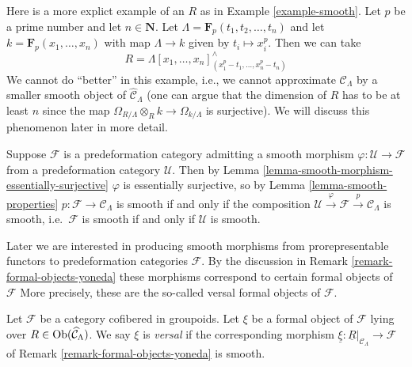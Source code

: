 \begin{example}
\label{example-smooth-explicit}
Here is a more explict example of an $R$ as in
Example \ref{example-smooth}.
Let $p$ be a prime number and let $n \in \mathbf{N}$.
Let $\Lambda = \mathbf{F}_p(t_1, t_2, \ldots, t_n)$ and let
$k = \mathbf{F}_p(x_1, \ldots, x_n)$ with map $\Lambda \to k$ given
by $t_i \mapsto x_i^p$. Then we can take
$$
R = \Lambda[x_1, \ldots, x_n]^\wedge_{(x_1^p - t_1, \ldots, x_n^p - t_n)}
$$
We cannot do ``better'' in this example, i.e., we cannot approximate
$\mathcal{C}_\Lambda$ by a smaller smooth object of
$\widehat{\mathcal{C}}_\Lambda$ (one can argue that the dimension of $R$
has to be at least $n$ since the map
$\Omega_{R/\Lambda} \otimes_R k \to \Omega_{k/\Lambda}$ is
surjective). We will discuss this phenomenon later in more detail.
\end{example}

\begin{remark}
\label{remark-smooth-on-top}
Suppose $\mathcal{F}$ is a predeformation category admitting a smooth morphism
$\varphi : \mathcal U \to \mathcal{F}$ from a predeformation category
$\mathcal{U}$.  Then by
Lemma \ref{lemma-smooth-morphism-essentially-surjective}
$\varphi$ is essentially surjective, so by
Lemma \ref{lemma-smooth-properties}
$p: \mathcal{F} \to \mathcal{C}_\Lambda$ is smooth if and only if the
composition $\mathcal U \xrightarrow{\varphi} \mathcal{F} \xrightarrow{p}
\mathcal{C}_\Lambda$ is smooth, i.e.\ $\mathcal{F}$ is smooth if and only if
$\mathcal{U}$ is smooth.
\end{remark}

\noindent
Later we are interested in producing smooth morphisms from
prorepresentable functors to predeformation categories $\mathcal{F}$.
By the discussion in
Remark \ref{remark-formal-objects-yoneda}
these morphisms correspond to certain formal objects of $\mathcal{F}$
More precisely, these are the so-called versal formal objects of $\mathcal{F}$.

\begin{definition}
\label{definition-versal}
Let $\mathcal{F}$ be a category cofibered in groupoids.  Let $\xi$ be a formal
object of $\mathcal{F}$ lying over $R \in \mathop{\rm Ob}\nolimits(\widehat{\mathcal
C}_\Lambda)$.  We say $\xi$ is {\it versal} if the corresponding morphism
$\underline{\xi}: \underline{R}|_{\mathcal{C}_\Lambda} \to \mathcal{F}$
of Remark \ref{remark-formal-objects-yoneda} is smooth.
\end{definition}

